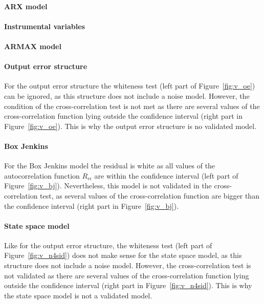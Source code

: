 \paragraph{ARX model}

\paragraph{Instrumental variables}

\paragraph{ARMAX model}

\paragraph{Output error structure} For the output error structure the whiteness test (left part of Figure~\ref{fig:v_oe}) can be ignored, as this structure does not include a noise model. However, the condition of the cross-correlation test is not met as there are several values of the cross-correlation function lying outside the confidence interval (right part in Figure~\ref{fig:v_oe}). This is why the output error structure is no validated model. 

\paragraph{Box Jenkins} For the Box Jenkins model the residual is white as all values of the autocorrelation function $R_{\epsilon \epsilon}$ are within the confidence interval (left part of Figure~\ref{fig:v_bj}). Nevertheless, this model is not validated in the cross-correlation test, as several values of the cross-correlation function are bigger than the confidence interval (right part in Figure~\ref{fig:v_bj}).

\paragraph{State space model}
Like for the output error structure, the whiteness test (left part of Figure~\ref{fig:v_n4sid}) does not make sense for the state space model, as this structure does not include a noise model. However, the cross-correlation test is not validated as there are several values of the cross-correlation function lying outside the confidence interval (right part in Figure~\ref{fig:v_n4sid}). This is why the state space model is not a validated model.


